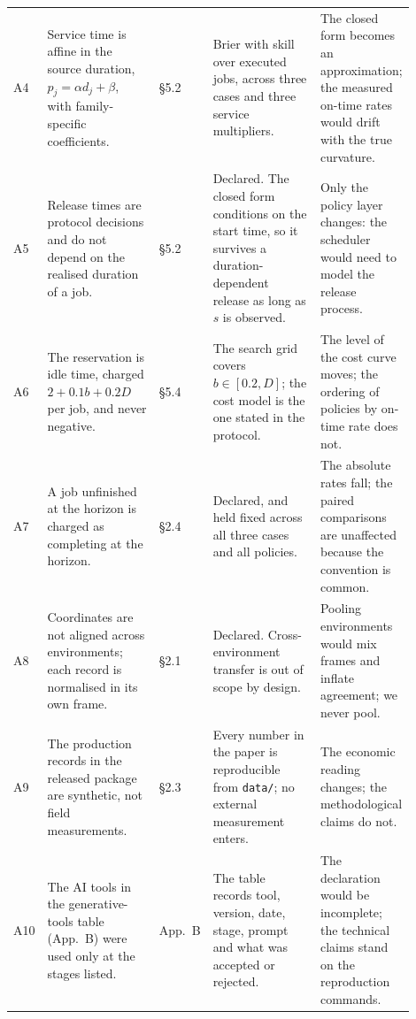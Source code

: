 {\begin{longtable}{@{}p{0.040\linewidth}p{0.28\linewidth}p{0.13\linewidth}p{0.27\linewidth}p{0.18\linewidth}@{}}
A4 & Service time is affine in the source duration, $p_j=\alpha d_j+\beta$, with family-specific coefficients. & \S5.2 & Brier \slotPCFBrier{} with skill \slotPCFSkill{} over \slotPCFJobs{} executed jobs, across three cases and three service multipliers. & The closed form becomes an approximation; the measured on-time rates would drift with the true curvature. \\
A5 & Release times are protocol decisions and do not depend on the realised duration of a job. & \S5.2 & Declared. The closed form conditions on the start time, so it survives a duration-dependent release as long as $s$ is observed. & Only the policy layer changes: the scheduler would need to model the release process. \\
A6 & The reservation is idle time, charged $2+0.1b+0.2D$ per job, and never negative. & \S5.4 & The search grid covers $b\in[0.2,D]$; the cost model is the one stated in the protocol. & The level of the cost curve moves; the ordering of policies by on-time rate does not. \\
A7 & A job unfinished at the horizon is charged as completing at the horizon. & \S2.4 & Declared, and held fixed across all three cases and all policies. & The absolute rates fall; the paired comparisons are unaffected because the convention is common. \\
A8 & Coordinates are not aligned across environments; each record is normalised in its own frame. & \S2.1 & Declared. Cross-environment transfer is out of scope by design. & Pooling environments would mix frames and inflate agreement; we never pool. \\
A9 & The production records in the released package are synthetic, not field measurements. & \S2.3 & Every number in the paper is reproducible from \texttt{data/}; no external measurement enters. & The economic reading changes; the methodological claims do not. \\
A10 & The AI tools in the generative-tools table (App.~B) were used only at the stages listed. & App.~B & The table records tool, version, date, stage, prompt and what was accepted or rejected. & The declaration would be incomplete; the technical claims stand on the reproduction commands. \\
\end{longtable}
}
